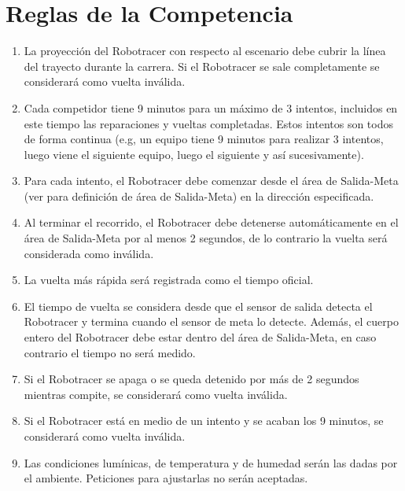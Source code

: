 \section{Reglas de la Competencia}

\begin{enumerate}
  \item La proyección del Robotracer con respecto al escenario debe cubrir la línea del trayecto durante la carrera. Si el Robotracer se sale completamente se considerará como vuelta inválida.

  \item Cada competidor tiene 9 minutos para un máximo de 3 intentos, incluidos en este tiempo las reparaciones y vueltas completadas. Estos intentos son todos de forma continua (e.g, un equipo tiene 9 minutos para realizar 3 intentos, luego viene el siguiente equipo, luego el siguiente y así sucesivamente).

  \item Para cada intento, el Robotracer debe comenzar desde el área de Salida-Meta (ver  para definición de área de Salida-Meta) en la dirección especificada.

  \item Al terminar el recorrido, el Robotracer debe detenerse automáticamente en el área de Salida-Meta por al menos 2 segundos, de lo contrario la vuelta será considerada como inválida.

  \item La vuelta más rápida será registrada como el tiempo oficial.

  \item El tiempo de vuelta se considera desde que el sensor de salida detecta el Robotracer y termina cuando el sensor de meta lo detecte. Además, el cuerpo entero del Robotracer debe estar dentro del área de Salida-Meta, en caso contrario el tiempo no será medido.

  \item Si el Robotracer se apaga o se queda detenido por más de 2 segundos mientras compite, se considerará como vuelta inválida.

  \item Si el Robotracer está en medio de un intento y se acaban los 9 minutos, se considerará como vuelta inválida.

  \item Las condiciones lumínicas, de temperatura y de humedad serán las dadas por el ambiente. Peticiones para ajustarlas no serán aceptadas.


\end{enumerate}
